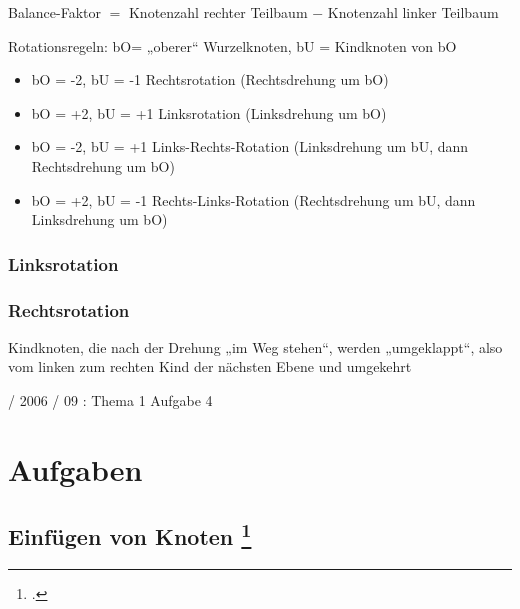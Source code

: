 \documentclass{lehramt-informatik}
\begin{document}
\begin{center}
Balance-Faktor $=$ Knotenzahl rechter Teilbaum $-$ Knotenzahl linker Teilbaum
\end{center}

Rotationsregeln:
bO= „oberer“ Wurzelknoten, bU = Kindknoten von bO

\begin{itemize}
\item bO = -2, bU = -1  Rechtsrotation (Rechtsdrehung um bO)
\item bO = +2, bU = +1  Linksrotation (Linksdrehung um bO)
\item bO = -2, bU = +1  Links-Rechts-Rotation (Linksdrehung um bU, dann Rechtsdrehung um bO)
\item bO = +2, bU = -1  Rechts-Links-Rotation (Rechtsdrehung um bU, dann Linksdrehung um bO)
\end{itemize}

%

\subsection{Linksrotation}


%

\subsection{Rechtsrotation}


Kindknoten, die nach der Drehung „im Weg stehen“, werden „umgeklappt“,
also vom linken zum rechten Kind der nächsten Ebene und umgekehrt

 / 2006 / 09 : Thema 1 Aufgabe 4


\chapter{Aufgaben}

\section{Einfügen von Knoten
\footcite[Seite 3, Aufgabe 5: AVL-Baum]{aud:ab:7}}
\end{document}
